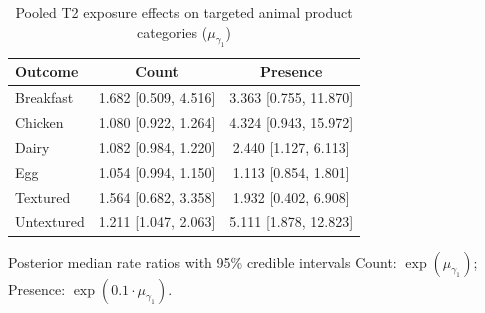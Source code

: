 \begin{table}[H]
\centering
\caption{Pooled T2 exposure effects on targeted animal product categories ($\mu_{\gamma_1}$)}
\label{tab:a2_t2_mu_gamma}
\begin{tabular}{lcc}
\toprule
Outcome & Count & Presence \\
\midrule
Breakfast & 1.682 [0.509, 4.516] & 3.363 [0.755, 11.870] \\
Chicken & 1.080 [0.922, 1.264] & 4.324 [0.943, 15.972] \\
Dairy & 1.082 [0.984, 1.220] & 2.440 [1.127, 6.113] \\
Egg & 1.054 [0.994, 1.150] & 1.113 [0.854, 1.801] \\
Textured & 1.564 [0.682, 3.358] & 1.932 [0.402, 6.908] \\
Untextured & 1.211 [1.047, 2.063] & 5.111 [1.878, 12.823] \\
\bottomrule
\end{tabular}
\par\smallskip\footnotesize Posterior median rate ratios with 95\% credible intervals Count: $\exp(\mu_{\gamma_1})$; Presence: $\exp(0.1 \cdot \mu_{\gamma_1})$.
\end{table}
